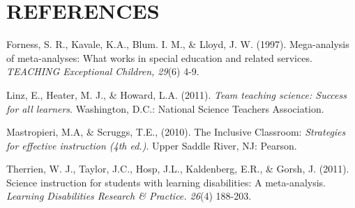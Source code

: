 \documentclass[11.5pt]{sig-alternate} %
\begin{document}
\section*{REFERENCES}\par 

\leftskip 0.25in
\parindent -0.25in 
Forness, S. R., Kavale, K.A., Blum. I. M., \& Lloyd, J. W. (1997). Mega-analysis of meta-analyses: What works in special education and related services. \textit{TEACHING Exceptional Children, 29}(6) 4-9.

Linz, E., Heater, M. J., \& Howard, L.A. (2011). \textit{Team teaching science: Success for all learners}. Washington, D.C.: National Science Teachers Association.

Mastropieri, M.A, \& Scruggs, T.E., (2010). The Inclusive Classroom: \textit{Strategies for effective instruction (4th ed.)}. Upper Saddle River, NJ: Pearson.

Therrien, W. J., Taylor, J.C., Hosp, J.L., Kaldenberg, E.R., \& Gorsh, J. (2011). Science instruction for students with learning disabilities: A meta-analysis. \textit{Learning Disabilities Research \& Practice. 26}(4) 188-203.
\end{document}

